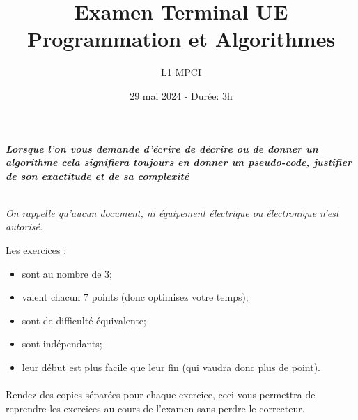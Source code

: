 \documentclass{article}
\title{Examen Terminal UE Programmation et Algorithmes}
\author{L1 MPCI}
\date{29 mai 2024 - Durée: 3h}
\theoremstyle{exostyle}
\theoremstyle{partiestyle}
\theoremstyle{questionstyle}
\begin{document}
\maketitle

\begin{center}
{\em\bf Lorsque l'on vous demande d'écrire de décrire ou de donner un algorithme cela signifiera toujours en donner un pseudo-code, justifier de son exactitude et de sa complexité}

~\\

{\em On rappelle qu'aucun document, ni équipement électrique ou électronique n'est autorisé. }
\end{center}


\vspace*{1cm}
Les exercices :
\begin{itemize}
\item sont au nombre de 3;
\item valent chacun 7 points (donc optimisez votre temps);
\item sont de difficulté équivalente;
\item sont indépendants;
\item leur début est plus facile que leur fin (qui vaudra donc plus de point).
\end{itemize}

\paragraph{}{\sc Rendez des copies séparées pour chaque exercice, ceci vous permettra de reprendre les exercices au cours de l'examen sans perdre le correcteur.}
\vspace*{1cm}

\clearpage
\end{document}
